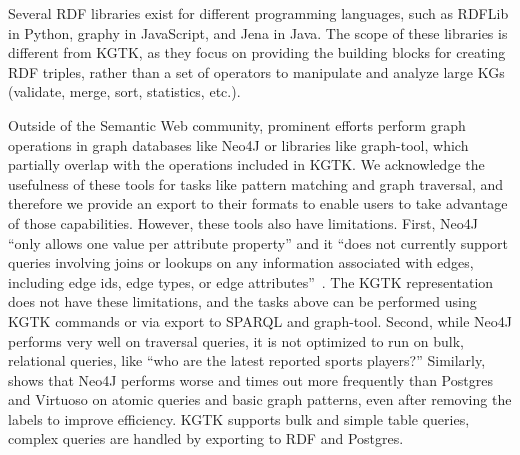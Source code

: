 \documentclass[runningheads]{llncs}
\begin{document}
Several RDF libraries exist for different programming languages, such as RDFLib in Python, graphy in JavaScript, and Jena in Java. The scope of these libraries is different from KGTK, as they focus on providing the building blocks for creating RDF triples, rather than a set of operators to manipulate and analyze large KGs (validate, merge, sort, statistics, etc.).



Outside of the Semantic Web community, prominent efforts perform graph operations in graph databases like Neo4J or libraries like graph-tool, which partially overlap with the operations included in KGTK. We acknowledge the usefulness of these tools for tasks like pattern matching and graph traversal, and therefore we provide an export to their formats to enable users to take advantage of those capabilities. However, these tools also have limitations. First, Neo4J ``only allows one value per attribute property'' and it ``does not currently support queries involving joins or lookups on any information associated with edges, including edge ids, edge types, or edge attributes''~\cite{hernandez2016querying}. The KGTK representation does not have these limitations, and the tasks above can be performed using KGTK commands or via export to SPARQL and graph-tool. Second, while Neo4J performs very well on traversal queries, it is not optimized to run on bulk, relational queries, like ``who are the latest reported sports players?'' Similarly,~\cite{hernandez2016querying} shows that Neo4J performs worse and times out more frequently than Postgres and Virtuoso on atomic queries and basic graph patterns, even after removing the labels to improve efficiency. KGTK supports bulk and simple table queries, complex queries are handled by exporting to RDF and Postgres. 
\end{document}
